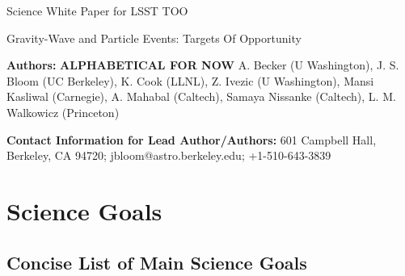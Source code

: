 \documentclass [11pt]{article}
\begin{document}

\centerline {\Large Science White Paper for LSST TOO}

\vspace*{0.2 cm}


%

\centerline {\Large Gravity-Wave and Particle Events: Targets Of Opportunity}

\vspace*{0.4 cm}

\noindent 
{\bf Authors:} {\bf ALPHABETICAL FOR NOW} A. Becker (U Washington),  J. S. Bloom (UC Berkeley), K. Cook (LLNL), Z. Ivezic (U Washington), Mansi Kasliwal (Carnegie), A. Mahabal (Caltech), Samaya Nissanke (Caltech), L. M. Walkowicz (Princeton)


\vspace*{0.2 cm}

\noindent 
{\bf Contact Information for Lead Author/Authors:} 601 Campbell Hall, Berkeley, CA 94720; jbloom@astro.berkeley.edu; +1-510-643-3839

\vspace*{0.2 cm}


\section{Science Goals}


\subsection{Concise List of Main Science Goals}

\end{document}
